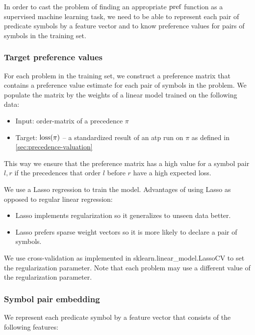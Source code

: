 In order to cast the problem of finding an appropriate \(\operatorname{pref}\) function
as a supervised machine learning task,
we need to be able to represent each pair of predicate symbols by a feature vector
and to know preference values for pairs of symbols in the training set.

\subsubsection{Target preference values}

For each problem in the training set, we construct a preference matrix that contains a preference
value estimate for each pair of symbols in the problem.
We populate the matrix by the weights of a linear model trained on the following data:

\begin{itemize}
	\item Input: \Gls{order-matrix} of a precedence \(\pi\)
	\item Target: \(\operatorname{loss}(\pi)\) --
	a standardized result of an \gls{atp} run on \(\pi\) as defined in \autoref{sec:precedence-valuation}
\end{itemize}

This way we ensure that the preference matrix has a high value for a symbol pair \(l, r\)
if the precedences that order \(l\) before \(r\) have a high expected loss.

We use a Lasso regression \cite{?} to train the model.
Advantages of using Lasso as opposed to regular linear regression:

\begin{itemize}
	\item Lasso implements regularization so it generalizes to unseen data better.
	\item Lasso prefers sparse weight vectors so it is more likely to declare a pair of symbols.
\end{itemize}

We use cross-validation as implemented in sklearn.linear\_model.LassoCV \cite{?}
to set the regularization parameter.
Note that each problem may use a different value of the regularization parameter.

\subsubsection{Symbol pair embedding}

We represent each predicate symbol by a feature vector that consists of the following features:

